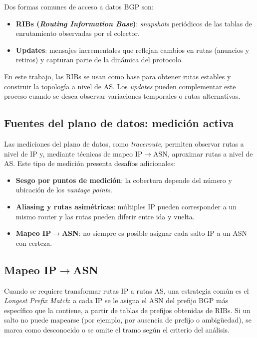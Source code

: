 Dos formas comunes de acceso a datos BGP son:
\begin{itemize}
    \item \textbf{RIBs (\textit{Routing Information Base})}: \textit{snapshots} periódicos de las tablas de enrutamiento observadas por el colector.
    \item \textbf{Updates}: mensajes incrementales que reflejan cambios en rutas (anuncios y retiros) y capturan parte de la dinámica del protocolo.
\end{itemize}

En este trabajo, las RIBs se usan como base para obtener rutas estables y construir la topología a nivel de AS. Los \textit{updates} pueden complementar este proceso cuando se desea observar variaciones temporales o rutas alternativas.

\subsection{Fuentes del plano de datos: medición activa}

Las mediciones del plano de datos, como \textit{traceroute}, permiten observar rutas a nivel de IP y, mediante técnicas de mapeo IP$\rightarrow$ASN, aproximar rutas a nivel de AS. Este tipo de medición presenta desafíos adicionales:
\begin{itemize}
    \item \textbf{Sesgo por puntos de medición}: la cobertura depende del número y ubicación de los \textit{vantage points}.
    \item \textbf{Aliasing y rutas asimétricas}: múltiples IP pueden corresponder a un mismo router y las rutas pueden diferir entre ida y vuelta.
    \item \textbf{Mapeo IP$\rightarrow$ASN}: no siempre es posible asignar cada salto IP a un ASN con certeza.
\end{itemize}

\subsection{Mapeo IP$\rightarrow$ASN}

Cuando se requiere transformar rutas IP a rutas AS, una estrategia común es el \textit{Longest Prefix Match}: a cada IP se le asigna el ASN del prefijo BGP más específico que la contiene, a partir de tablas de prefijos obtenidas de RIBs. Si un salto no puede mapearse (por ejemplo, por ausencia de prefijo o ambigüedad), se marca como desconocido o se omite el tramo según el criterio del análisis.

